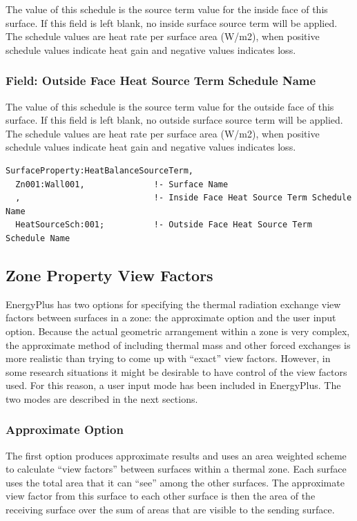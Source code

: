 The value of this schedule is the source term value for the inside face of this surface. If this field is left blank, no inside surface source term will be applied. The schedule values are heat rate per surface area (W/m2), when positive schedule values indicate heat gain and negative values indicates loss.

\subsubsection{Field: Outside Face Heat Source Term Schedule Name}\label{field-outside-heat-source-term-schedule-name}

The value of this schedule is the source term value for the outside face of this surface. If this field is left blank, no outside surface source term will be applied. The schedule values are heat rate per surface area (W/m2), when positive schedule values indicate heat gain and negative values indicates loss.

\begin{lstlisting}
SurfaceProperty:HeatBalanceSourceTerm,
  Zn001:Wall001,              !- Surface Name
  ,                           !- Inside Face Heat Source Term Schedule Name
  HeatSourceSch:001;          !- Outside Face Heat Source Term Schedule Name
\end{lstlisting}

\subsection{Zone Property View Factors}\label{zone-property-view-factors}

EnergyPlus has two options for specifying the thermal radiation exchange view factors between surfaces in a zone: the approximate option and the user input option. Because the actual geometric arrangement within a zone is very complex, the approximate method of including thermal mass and other forced exchanges is more realistic than trying to come up with ``exact'' view factors. However, in some research situations it might be desirable to have control of the view factors used. For this reason, a user input mode has been included in EnergyPlus. The two modes are described in the next sections.

\subsubsection{Approximate Option}\label{approximate-option}

The first option produces approximate results and uses an area weighted scheme to calculate ``view factors'' between surfaces within a thermal zone. Each surface uses the total area that it can ``see'' among the other surfaces. The approximate view factor from this surface to each other surface is then the area of the receiving surface over the sum of areas that are visible to the sending surface.

